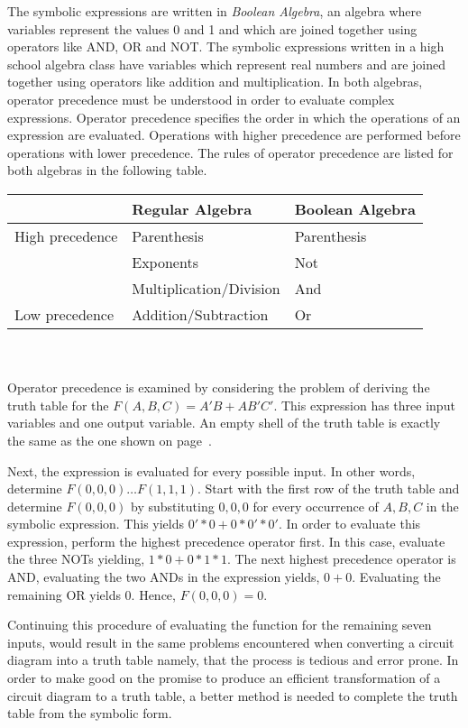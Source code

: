 The symbolic expressions are written in 
\textit{Boolean Algebra},  an algebra where variables
represent the values 0 and 1 and which are joined together using operators 
like AND, OR and NOT.  The symbolic expressions written in a 
high school algebra class have variables which represent real numbers and
are joined together using operators like addition and multiplication.  In 
both algebras, operator precedence must be understood in order to evaluate
complex expressions.  Operator precedence specifies the order in which the
operations of an expression are evaluated.  Operations with higher precedence
are performed before operations with lower precedence.  The rules of operator 
precedence are listed for both algebras in the following table.

\begin{tabular}[ht]{l|l|l}
			& Regular Algebra			& Boolean Algebra \\ \hline \hline
High precedence	& Parenthesis			& Parenthesis	\\ \hline
			& Exponents				& Not			\\ \hline
			& Multiplication/Division	& And			\\ \hline
Low precedence	& Addition/Subtraction 		& Or 			\\
\end{tabular}
\\ \\
Operator precedence is examined by considering the problem of
deriving the truth table for the $F(A,B,C) = A'B + AB'C'$.  This expression
has three input variables and one output variable.  An empty shell of the 
truth table is exactly the same as the one shown on 
page~\pageref{page:TTshell}.  

Next, the expression is evaluated for every possible input.  In 
other words, determine $F(0,0,0) \ldots F(1,1,1)$.  Start with 
the first row of the truth table and determine $F(0,0,0)$ by
substituting $0,0,0$ for every occurrence of $A,B,C$ in the symbolic 
expression.  This yields $0'*0+0*0'*0'$.  In order to evaluate this expression, 
perform the highest precedence operator first.  In this case, evaluate 
the three NOTs yielding, $1*0+0*1*1$.  The next highest 
precedence operator is AND, evaluating the two ANDs in the expression 
yields, $0+0$.   Evaluating the remaining OR yields 0.  Hence, $F(0,0,0)=0$.

Continuing this procedure of evaluating the function for the remaining seven
inputs, would result in the same problems encountered when converting  a
circuit diagram into a truth table namely, that the
process is tedious and error prone.  In order to make good on the 
promise to produce an efficient transformation of a circuit diagram 
to a truth table, a better method is needed to complete the truth table
from the symbolic form.


